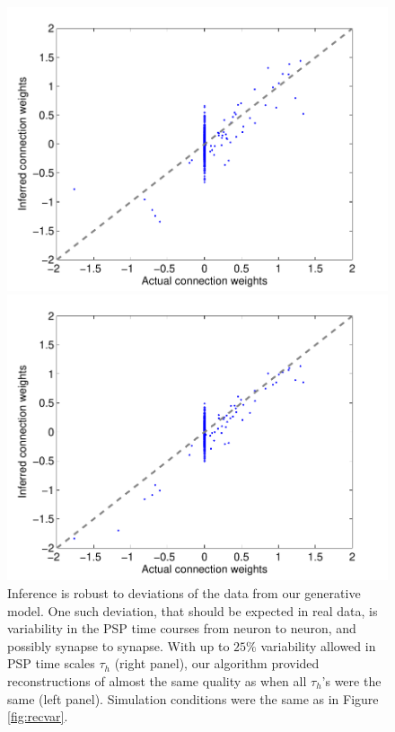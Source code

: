 \documentclass[aoas,preprint]{imsart}
\begin{document}
\begin{figure}[h]
\centering
\begin{minipage}[c]{0.45\hsize}
\includegraphics[width=\hsize]{../figs/FigureA9_all_same_sol}
\end{minipage}
\begin{minipage}[c]{0.45\hsize}
\includegraphics[width=\hsize]{../figs/FigureA9_variable_25}
\end{minipage}
\caption{
Inference is robust to deviations of the data from our generative model. One such deviation, that should be expected in real data, is variability in the PSP time courses from neuron to neuron, and possibly synapse to synapse. With up to $25\%$ variability allowed in PSP time scales $\tau_h$ (right panel), our algorithm provided reconstructions of almost the same quality as when all $\tau_h$'s were the same (left panel). Simulation conditions were the same as in Figure \ref{fig:recvar}.}
\label{fig:vartau}
\end{figure}
\end{document}
